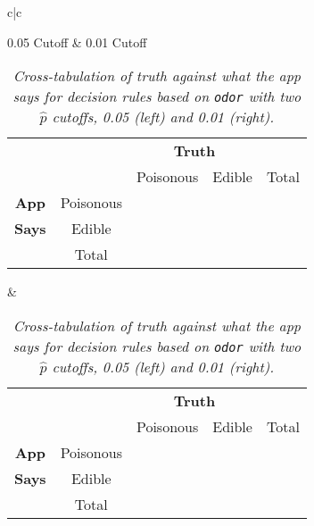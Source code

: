 \documentclass[12pt]{article}
\begin{document}
\begin{itemize}
\begin{table}[t!]
\caption{\textit{Cross-tabulation of truth against what the app says for decision rules based on \texttt{odor} with two $\hat{ p }$ cutoffs, 0.05 (left) and 0.01 (right).}}

\bigskip

\begin{tabular}{c|c}

\textsf{0.05 Cutoff} & \textsf{0.01 Cutoff} \\ 

\begin{tabular}{cc|c|c|c}

& \multicolumn{1}{c}{} & \multicolumn{2}{c}{\textbf{Truth}} \\

& \multicolumn{1}{c}{} & \multicolumn{1}{c}{Poisonous} & \multicolumn{1}{c}{Edible} & Total \\ \cline{3-4}

\textbf{App} & Poisonous & \multicolumn{1}{c|}{} & \multicolumn{1}{c|}{} \\ \cline{3-4}

\textbf{Says} & Edible & \multicolumn{1}{c|}{} & \multicolumn{1}{c|}{} \\ \cline{3-4}

& \multicolumn{1}{c}{Total}

\end{tabular}

& 

\begin{tabular}{cc|c|c|c}

& \multicolumn{1}{c}{} & \multicolumn{2}{c}{\textbf{Truth}} \\

& \multicolumn{1}{c}{} & \multicolumn{1}{c}{Poisonous} & \multicolumn{1}{c}{Edible} & Total \\ \cline{3-4}

\textbf{App} & Poisonous & \multicolumn{1}{c|}{} & \multicolumn{1}{c|}{} \\ \cline{3-4}

\textbf{Says} & Edible & \multicolumn{1}{c|}{} & \multicolumn{1}{c|}{} \\ \cline{3-4}

& \multicolumn{1}{c}{Total}

\end{tabular}

\end{tabular}

\label{t:decision-rules-1}

\end{table}


\end{itemize}
\end{document}
